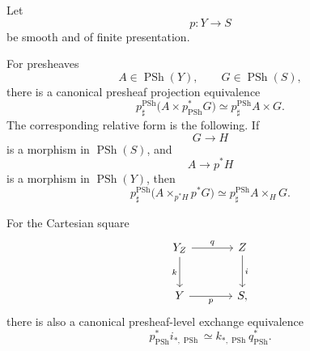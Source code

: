 \begin{lemma}
\label{lem:presheaf-projection-smooth-closed-exchange}
Let
\[
    p
    \colon
    Y
    \longrightarrow
    S
\]
be smooth and of finite presentation.

For presheaves
\[
    A
    \in
    \operatorname{PSh}(Y),
    \qquad
    G
    \in
    \operatorname{PSh}(S),
\]
there is a canonical presheaf projection equivalence
\[
    p^{\operatorname{PSh}}_\sharp
    \bigl(
        A\times p_{\operatorname{PSh}}^*G
    \bigr)
    \simeq
    p^{\operatorname{PSh}}_\sharp A
    \times
    G.
\]
The corresponding relative form is the following.  If
\[
    G
    \longrightarrow
    H
\]
is a morphism in \(\operatorname{PSh}(S)\), and
\[
    A
    \longrightarrow
    p^*H
\]
is a morphism in \(\operatorname{PSh}(Y)\), then
\[
    p^{\operatorname{PSh}}_\sharp
    \bigl(
        A\times_{p^*H}p^*G
    \bigr)
    \simeq
    p^{\operatorname{PSh}}_\sharp A
    \times_H
    G.
\]

For the Cartesian square
\[
\begin{tikzcd}[column sep=large, row sep=large]
    Y_Z
        \arrow[r, "q"]
        \arrow[d, "k"']
    &
    Z
        \arrow[d, "i"]
    \\
    Y
        \arrow[r, "p"']
    &
    S,
\end{tikzcd}
\]
there is also a canonical presheaf-level exchange equivalence
\[
    p_{\operatorname{PSh}}^*
    i_{*,\operatorname{PSh}}
    \simeq
    k_{*,\operatorname{PSh}}
    q_{\operatorname{PSh}}^*.
\]
\end{lemma}

